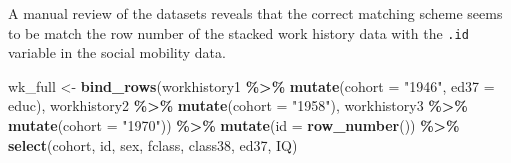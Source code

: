 \documentclass[
]{article}
\newenvironment{Shaded}{\begin{snugshade}}{\end{snugshade}}
\newcommand{\AttributeTok}[1]{\textcolor[rgb]{0.13,0.29,0.53}{#1}}
\newcommand{\FunctionTok}[1]{\textcolor[rgb]{0.13,0.29,0.53}{\textbf{#1}}}
\newcommand{\NormalTok}[1]{#1}
\newcommand{\OtherTok}[1]{\textcolor[rgb]{0.56,0.35,0.01}{#1}}
\newcommand{\SpecialCharTok}[1]{\textcolor[rgb]{0.81,0.36,0.00}{\textbf{#1}}}
\newcommand{\StringTok}[1]{\textcolor[rgb]{0.31,0.60,0.02}{#1}}
\begin{document}
A manual review of the datasets reveals that the correct matching scheme
seems to be match the row number of the stacked work history data with
the \texttt{.id} variable in the social mobility data.

\begin{Shaded}
\begin{Highlighting}[]
\NormalTok{wk\_full }\OtherTok{\textless{}{-}} \FunctionTok{bind\_rows}\NormalTok{(workhistory1 }\SpecialCharTok{\%\textgreater{}\%} \FunctionTok{mutate}\NormalTok{(}\AttributeTok{cohort =} \StringTok{"1946"}\NormalTok{,}
                                             \AttributeTok{ed37 =}\NormalTok{ educ),}
\NormalTok{                     workhistory2 }\SpecialCharTok{\%\textgreater{}\%} \FunctionTok{mutate}\NormalTok{(}\AttributeTok{cohort =} \StringTok{"1958"}\NormalTok{),}
\NormalTok{                     workhistory3 }\SpecialCharTok{\%\textgreater{}\%} \FunctionTok{mutate}\NormalTok{(}\AttributeTok{cohort =} \StringTok{"1970"}\NormalTok{)) }\SpecialCharTok{\%\textgreater{}\%}
  \FunctionTok{mutate}\NormalTok{(}\AttributeTok{id =} \FunctionTok{row\_number}\NormalTok{()) }\SpecialCharTok{\%\textgreater{}\%}
  \FunctionTok{select}\NormalTok{(cohort, id, sex, fclass, class38, ed37, IQ)}


\end{Highlighting}
\end{Shaded}
\end{document}
